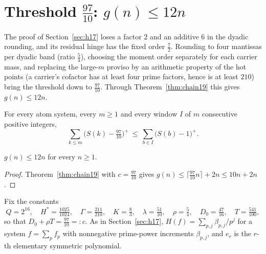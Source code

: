 \section{Threshold $\tfrac{97}{10}$: $g(n)\le12n$}\label{sec:h97}

The proof of Section~\ref{sec:h17} loses a factor $2$ and an additive $6$ in the dyadic rounding, and its
residual hinge has the fixed order $\tfrac72$. Rounding to four mantissas per dyadic band (ratio $\tfrac54$), choosing
the moment order separately for each carrier mass, and replacing the large-$m$ proviso by an arithmetic property of the
hot points (a carrier's cofactor has at least four prime factors, hence is at least $210$) bring the threshold down to
$\tfrac{97}{10}$. Through Theorem~\ref{thm:chain19} this gives $g(n)\le12n$.

\begin{theorem}\label{thm:h97}
For every atom system, every $m\ge1$ and every window $I$ of $m$ consecutive positive integers,
\[
\sum_{k\le m}\bigl(S(k)-\tfrac{97}{10}\bigr)^+\ \le\ \sum_{b\in I}\bigl(S(b)-1\bigr)^+ .
\]
\end{theorem}

\begin{corollary}\label{cor:12n}
$g(n)\le12n$ for every $n\ge1$.
\end{corollary}
\begin{proof}
Theorem~\ref{thm:chain19} with $c=\tfrac{97}{10}$ gives $g(n)\le\lceil\tfrac{97}{10}n\rceil+2n\le10n+2n$.
\end{proof}

Fix the constants
\[
Q=2^{16},\quad H^*=\tfrac{1025}{1024},\quad \Gamma=\tfrac{211}{210},\quad K=\tfrac83,\quad
\lambda=\tfrac{51}{10},\quad \rho=\tfrac54,\quad D_0=\tfrac{47}{16},\quad T=\tfrac{541}{100},
\]
so that $D_0+\rho T=\tfrac{97}{10}=:c$. As in Section~\ref{sec:h17}, $H(f)=\sum_{p,j}\beta_{p,j}/p^j$ for a system
$f=\sum_pf_p$ with nonnegative prime-power increments $\beta_{p,j}$, and $e_r$ is the $r$-th elementary symmetric
polynomial.

